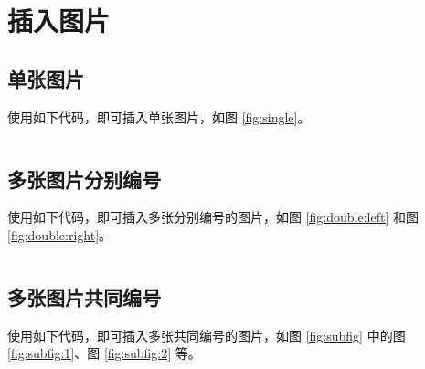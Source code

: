 \section{插入图片}
\subsection{单张图片}
使用如下代码，即可插入单张图片，如图 \ref{fig:single}。

\inputminted{latex}{src/image-single.tex}


\newpage
\subsection{多张图片分别编号}
使用如下代码，即可插入多张分别编号的图片，如图 \ref{fig:double:left} 和图 \ref{fig:double:right}。

\inputminted{latex}{src/image-double.tex}


\newpage
\subsection{多张图片共同编号}
使用如下代码，即可插入多张共同编号的图片，如图 \ref{fig:subfig} 中的图 \ref{fig:subfig:1}、图 \ref{fig:subfig:2} 等。

\inputminted{latex}{src/image-subfig.tex}

